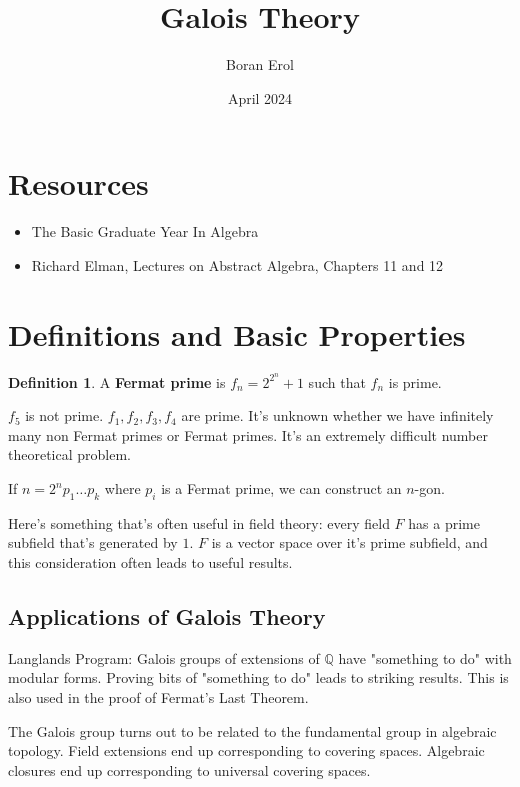\documentclass{article}
\title{Galois Theory}
\date{April 2024}
\author{Boran Erol}
\theoremstyle{definition}
\newtheorem{definition}{Definition}
\newcommand{\Q}{\mathbb{Q}}
\begin{document}
\maketitle

\section{Resources}

\begin{itemize}
    \item The Basic Graduate Year In Algebra
    \item Richard Elman, Lectures on Abstract Algebra, Chapters 11 and 12
\end{itemize}

\section{Definitions and Basic Properties}

\begin{definition}
    A \textbf{Fermat prime} is $f_{n} = 2^{2^{n}} + 1$ such that $f_{n}$ is prime.
\end{definition}

$f_{5}$ is not prime. $f_{1},f_{2},f_{3},f_{4}$ are prime. It's unknown whether we have
infinitely many non Fermat primes or Fermat primes. It's an extremely difficult number
theoretical problem.

If $n = 2^{n}p_{1} \ldots p_{k}$ where $p_{i}$ is a Fermat prime, we can construct an $n$-gon.

Here's something that's often useful in field theory: every field $F$ has a prime subfield
that's generated by $1$. $F$ is a vector space over it's prime subfield, and this consideration
often leads to useful results.

\subsection{Applications of Galois Theory}

Langlands Program: Galois groups of extensions of $\Q$ have "something to do" with modular forms.
Proving bits of "something to do" leads to striking results. This is also used in the proof
of Fermat's Last Theorem.

The Galois group turns out to be related to the fundamental group in algebraic topology.
Field extensions end up corresponding to covering spaces. Algebraic closures end
up corresponding to universal covering spaces.
\end{document}
